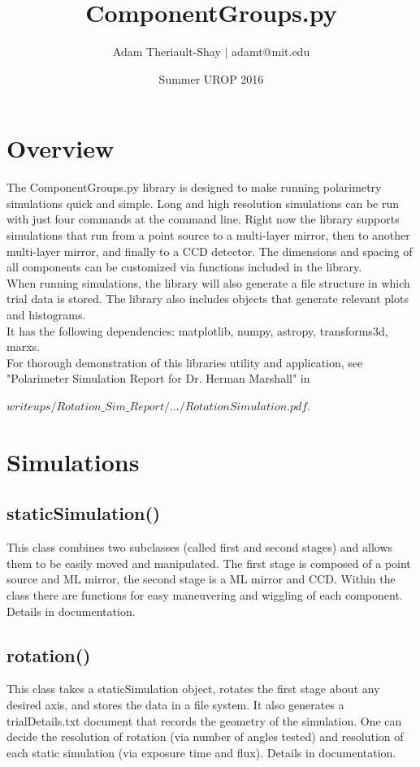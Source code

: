 \documentclass[11pt, oneside]{ltxdoc}   	%
\title{ComponentGroups.py}
\author{Adam Theriault-Shay $\vert$ adamt@mit.edu}
\date{Summer UROP 2016}							%
\begin{document}
\maketitle
\section{Overview}
The ComponentGroups.py library is designed to make running polarimetry simulations quick and simple. Long and high resolution simulations can be run with just four commands at the command line. Right now the library supports simulations that run from a point source to a multi-layer mirror, then to another multi-layer mirror, and finally to a CCD detector. The dimensions and spacing of all components can be customized via functions included in the library.\\
When running simulations, the library will also generate a file structure in which trial data is stored. The library also includes objects that generate relevant plots and histograms.\\
It has the following dependencies: matplotlib, numpy, astropy, transforms3d, marxs.\\
For thorough demonstration of this libraries utility and application, see "Polarimeter Simulation Report for Dr. Herman Marshall" in 

$writeups / Rotation\_Sim\_Report / ... / RotationSimulation.pdf$.

\section{Simulations}
\subsection{staticSimulation()}
This class combines two subclasses (called first and second stages) and allows them to be easily moved and manipulated. The first stage is composed of a point source and ML mirror, the second stage is a ML mirror and CCD. Within the class there are functions for easy maneuvering and wiggling of each component. Details in documentation.
\subsection{rotation()}
This class takes a staticSimulation object, rotates the first stage about any desired axis, and stores the data in a file system. It also generates a trialDetails.txt document that records the geometry of the simulation. One can decide the resolution of rotation (via number of angles tested) and resolution of each static simulation (via exposure time and flux). Details in documentation.
\end{document}
